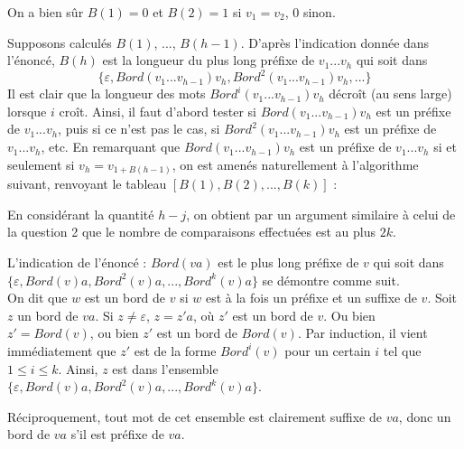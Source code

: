 \Q
On a bien sûr $B(1)=0$ et $B(2)=1$ si $v_1=v_2$, 0 sinon.
\smallskip

Supposons calculés $B(1)$, ..., $B(h-1)$. D'après l'indication donnée dans l'énoncé, $B(h)$ est la longueur du plus long préfixe de $v_1...v_h$ qui soit dans
\[
    \{\varepsilon, Bord(v_1...v_{h-1})v_h,Bord^2(v_1...v_{h-1})v_h, ...\}
\]
Il est clair que la longueur des mots $Bord^i(v_1...v_{h-1})v_h$ décroît (au sens large) lorsque $i$ croît. Ainsi, il faut d'abord tester si $Bord(v_1...v_{h-1})v_h$ est un préfixe de $v_1...v_h$, puis si ce n'est pas le cas, si $Bord^2(v_1...v_{h-1})v_h$ est un préfixe de $v_1...v_h$, etc. En remarquant que $Bord(v_1...v_{h-1})v_h$ est un préfixe de $v_1...v_h$ si et seulement si $v_h=v_{1+B(h-1)}$, on est amenés naturellement à l'algorithme suivant, renvoyant le tableau $[B(1), B(2), ..., B(k)]$ :



En considérant la quantité $h-j$, on obtient par un argument similaire à celui de la question 2 que le nombre de comparaisons effectuées est au plus $2k$.
\bigskip

L'indication de l'énoncé : $Bord(va)$ est le plus long préfixe de $v$ qui soit dans \newline $\{\varepsilon, Bord(v)a,Bord^2(v)a, ..., Bord^k(v)a\}$ se démontre comme suit.\\
On dit que $w$ est un bord de $v$ si $w$ est à la fois un préfixe et un suffixe de $v$. Soit $z$ un bord de $va$. Si $z \neq \varepsilon$, $z = z'a$, où $z'$ est un bord de $v$. Ou bien $z'=Bord(v)$, ou bien $z'$ est un bord de $Bord(v)$. Par induction, il vient immédiatement que $z'$ est de la forme $Bord^i(v)$ pour un certain $i$ tel que $1 \leq i \leq k$. Ainsi, $z$ est dans l'ensemble $\{\varepsilon, Bord(v)a,Bord^2(v)a, ..., Bord^k(v)a\}$.
\smallskip

Réciproquement, tout mot de cet ensemble est clairement suffixe de $va$, donc un bord de $va$ s'il est préfixe de $va$.
\bigskip

\Fin
